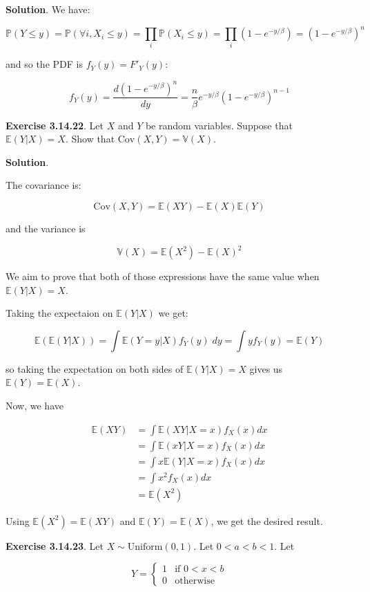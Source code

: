 \textbf{Solution}. We have:

\[ \mathbb{P}(Y \leq y) = \mathbb{P}(\forall i, X_{i} \leq y) = \prod_{i} \mathbb{P}(X_{i} \leq y) = \prod_{i} \left(1 - e^{-y/\beta}\right) = (1 - e^{-y/\beta})^{n} \]

and so the PDF is \(f_Y(y) = F'_Y(y)\):

\[ f_Y(y) = \frac{d (1 - e^{-y/\beta})^{n}}{dy} = \frac{n}{\beta} e^{-y/\beta} (1 - e^{-y/\beta})^{n-1}\]

\textbf{Exercise 3.14.22}. Let \(X\) and \(Y\) be random variables.
Suppose that \(\mathbb{E}(Y | X) = X\). Show that
\(\text{Cov}(X, Y) = \mathbb{V}(X)\).

\textbf{Solution}.

The covariance is:

\[ \text{Cov}(X, Y) = \mathbb{E}(XY) - \mathbb{E}(X) \mathbb{E}(Y) \]

and the variance is

\[ \mathbb{V}(X) = \mathbb{E}(X^{2}) - \mathbb{E}(X)^{2} \]

We aim to prove that both of those expressions have the same value when
\(\mathbb{E}(Y | X) = X\).

Taking the expectaion on \(\mathbb{E}(Y | X)\) we get:

\[ \mathbb{E}(\mathbb{E}(Y | X)) = \int \mathbb{E}(Y = y | X) f_Y(y) \; dy = \int y f_Y(y) = \mathbb{E}(Y) \]

so taking the expectation on both sides of \(\mathbb{E}(Y | X) = X\)
gives us \(\mathbb{E}(Y) = \mathbb{E}(X)\).

Now, we have

\begin{align*}
\mathbb{E}(XY) &= \int \mathbb{E}(XY | X = x) f_X(x) dx \\
&= \int \mathbb{E}(xY | X = x) f_X(x) dx \\
&= \int x \mathbb{E}(Y | X = x) f_X(x) dx \\
&= \int x^{2} f_X(x) dx \\
&= \mathbb{E}(X^{2})
\end{align*}

Using \(\mathbb{E}(X^{2}) = \mathbb{E}(XY)\) and
\(\mathbb{E}(Y) = \mathbb{E}(X)\), we get the desired result.

\textbf{Exercise 3.14.23}. Let \(X \sim \text{Uniform}(0, 1)\). Let
\(0 < a < b < 1\). Let

\[
Y = \begin{cases}
1 &\text{if } 0 < x < b \\
0 &\text{otherwise}
\end{cases}
\]

